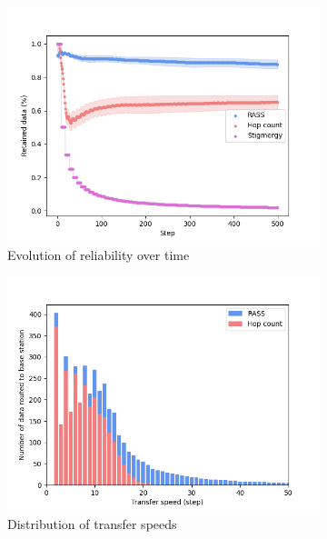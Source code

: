 \documentclass[letterpaper, 10 pt, conference]{ieeeconf}
\begin{document}
\begin{figure}
    \centering
    \begin{subfigure}{0.30\textwidth}
        \includegraphics[width=\textwidth]{figures/random_reliability.png}
        \caption{Evolution of reliability over time}
        \label{results:random_100_reliability}
    \end{subfigure}
    \begin{subfigure}{0.30\textwidth}
        \includegraphics[width=\textwidth]{figures/random_speed.png}
        \caption{Distribution of transfer speeds}
        \label{results:random_100_speed}
    \end{subfigure}
    \begin{subfigure}{0.30\textwidth}

\end{subfigure}
\end{figure}
\end{document}
